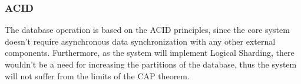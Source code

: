 \subsubsection{ACID}

The database operation is based on the ACID principles, since the core system doesn't require asynchronous data synchronization with any other external components.
Furthermore, as the system will implement Logical Sharding, there wouldn't be a need for increasing the partitions of the database, thus the system will not suffer from the limits of the CAP theorem.


